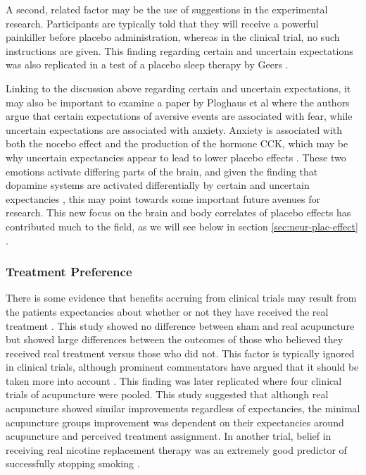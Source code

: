 A second, related factor may be the use of suggestions in the experimental research. Participants are typically told that they will receive a powerful painkiller before placebo administration, whereas in the clinical trial, no such instructions are given. This finding regarding certain and uncertain expectations was also replicated in a test of a placebo sleep therapy by Geers  \cite{Geers2005a}.

Linking to the discussion above regarding certain and uncertain expectations, it may also be important to examine a paper by Ploghaus et al \cite{Ploghaus2003} where the authors argue that certain expectations of aversive events are associated with fear, while uncertain expectations are associated with anxiety. Anxiety is associated with both the nocebo effect and the production of the hormone CCK, which may be why uncertain expectancies appear to lead to lower placebo effects \cite{Colloca2008b}. These two emotions activate differing parts of the brain, and given the finding that dopamine systems are activated differentially by certain and uncertain expectancies \cite{Scott2007a}, this may point towards some important future avenues for research. This new focus on the brain and body correlates of placebo effects has contributed much to the field, as we will see below in section \ref{sec:neur-plac-effect} .

\subsubsection{Treatment Preference}
\label{sec:treatment-preference}


There is some evidence that benefits accruing from clinical trials may result from the patients expectancies about whether or not they have received the real treatment \cite{Bausell2005}. This study showed no difference between sham and real acupuncture but showed large differences between the outcomes of those who believed they received real treatment versus those who did not. This factor is typically ignored in clinical trials, although prominent commentators have argued that it should be taken more into account \cite{Benedetti2007}. This finding was later replicated \cite{Linde2007}  where four clinical trials of acupuncture were pooled. This study suggested that although real acupuncture showed similar improvements regardless of expectancies, the minimal acupuncture groups improvement was dependent on their expectancies around acupuncture and perceived treatment assignment. In another trial, belief in receiving real nicotine replacement therapy was an extremely good predictor of successfully stopping smoking \cite{Benedetti2008}. 

